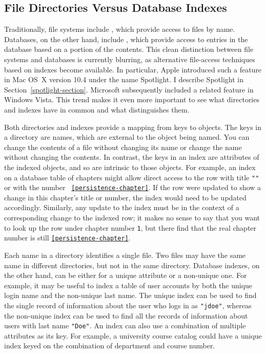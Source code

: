 \subsection{File Directories Versus Database Indexes}\label{directory-index-comparison-section}

Traditionally, file systems include , which provide access
to files by name.  Databases, on the other hand, include ,
which provide access to entries in the database based on a portion of
the contents.  This clean distinction between file systems and
databases is currently blurring, as alternative file-access techniques
based on indexes become available.  In particular, Apple introduced
such a feature in Mac OS~X version 10.4 under the name Spotlight.  I
describe Spotlight in Section~\ref{spotlight-section}.  Microsoft
subsequently included a related feature in
Windows Vista.  This trend makes it even more
important to see what directories and indexes have in common and what
distinguishes them.

Both directories and indexes provide a mapping from keys to objects.
The keys in a directory are names, which are external to the object
being named.  You can change the contents of a file without changing
its name or change the name without changing the contents.  In
contrast, the keys in an index are attributes of the indexed objects,
and so are intrinsic to those objects.  For example, an index on a
database table of chapters might allow direct access to the row with
title {\tt "\persistenceChapterTitle"} or with the number {\tt
\ref{persistence-chapter}}.  If the row were updated to show a change
in this chapter's title or number, the index would need to be updated
accordingly.  Similarly, any update to the index must be in the context of
a corresponding change to
the indexed row; it makes no sense to say that you want
to look up the row under chapter number {\tt 1}, but there find that
the real chapter number is still {\tt \ref{persistence-chapter}}.

Each name in a directory identifies a single file.  Two files may have
the same name in different directories, but not in the same directory.
Database indexes, on the other hand, can be either for a unique
attribute or a non-unique one.  For example, it may be useful to index
a table of user accounts by both the unique login name and the
non-unique last name.  The unique index can be used to find the single
record of information about the user who logs in as {\tt "jdoe"},
whereas the non-unique index can be used to find all the records of
information about users with last name {\tt "Doe"}.    An index can
also use a combination of multiple attributes as its key.  For
example, a university course catalog could have a unique index
keyed on the combination of department and course number.


